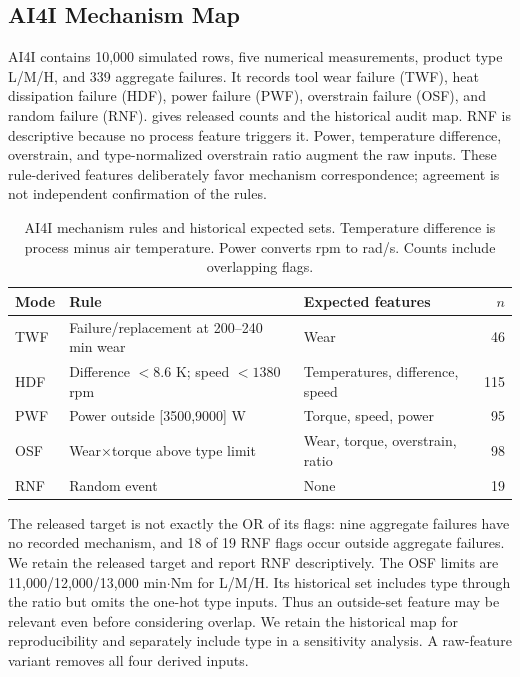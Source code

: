\documentclass[conference]{IEEEtran}
\begin{document}
\subsection{AI4I Mechanism Map}
AI4I contains 10{,}000 simulated rows, five numerical measurements, product type L/M/H, and 339 aggregate failures. It records tool wear failure (TWF), heat dissipation failure (HDF), power failure (PWF), overstrain failure (OSF), and random failure (RNF).  gives released counts and the historical audit map. RNF is descriptive because no process feature triggers it. Power, temperature difference, overstrain, and type-normalized overstrain ratio augment the raw inputs. These rule-derived features deliberately favor mechanism correspondence; agreement is not independent confirmation of the rules.

\begin{table}[t]
\centering
\caption{AI4I mechanism rules and historical expected sets. Temperature difference is process minus air temperature. Power converts rpm to rad/s. Counts include overlapping flags.}
\label{tab:mechanisms}
\footnotesize
\setlength{\tabcolsep}{3pt}
\begin{tabular}{@{}lL{2.8cm}L{2.7cm}r@{}}
\toprule
Mode & Rule & Expected features & $n$ \\
\midrule
TWF & Failure/replacement at 200--240 min wear & Wear & 46 \\
HDF & Difference $<8.6$ K; speed $<1380$ rpm & Temperatures, difference, speed & 115 \\
PWF & Power outside [3500,9000] W & Torque, speed, power & 95 \\
OSF & Wear$\times$torque above type limit & Wear, torque, overstrain, ratio & 98 \\
RNF & Random event & None & 19 \\
\bottomrule
\end{tabular}
\end{table}

The released target is not exactly the OR of its flags: nine aggregate failures have no recorded mechanism, and 18 of 19 RNF flags occur outside aggregate failures. We retain the released target and report RNF descriptively. The OSF limits are 11{,}000/12{,}000/13{,}000 min$\cdot$Nm for L/M/H. Its historical set includes type through the ratio but omits the one-hot type inputs. Thus an outside-set feature may be relevant even before considering overlap. We retain the historical map for reproducibility and separately include type in a sensitivity analysis. A raw-feature variant removes all four derived inputs.
\end{document}
